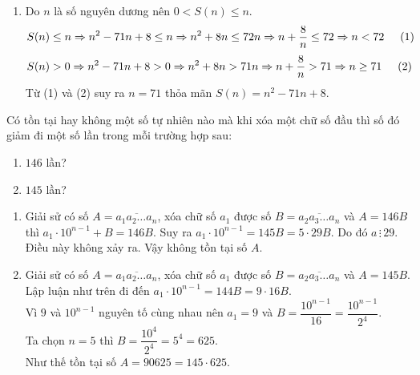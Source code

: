 \begin{bt}
{\begin{enumerate}
   Vậy các số phải tìm là $40$; $41$; $42$; $43$; $44$; $45$; $46$; $47$; $48$; $49$.
   \item Do $n$ là số nguyên dương nên $0 < S(n) \leq n$.\\
   $$S(n) \leq n \Rightarrow n^2 - 71n + 8 \leq n \Rightarrow n^2 + 8n \leq 72n \Rightarrow n + \dfrac{8}{n} \leq 72 \Rightarrow n < 72 \hspace*{0.5cm} (1)$$
   $$S(n) > 0 \Rightarrow n^2 - 71n + 8 > 0 \Rightarrow n^2 + 8n > 71n \Rightarrow n + \dfrac{8}{n} > 71 \Rightarrow n \geq 71 \hspace*{0.5cm} (2)$$
   Từ (1) và (2) suy ra $n = 71$ thỏa mãn $S(n) = n^2 - 71n + 8$.
  \end{enumerate}      
  }
\end{bt}


\begin{bt}
 Có tồn tại hay không một số tự nhiên nào mà khi xóa một chữ số đầu thì số đó giảm đi một số lần trong mỗi trường hợp sau:
 \begin{multicols}{2}
  \begin{enumerate}
   \item $146$ lần?
   \item $145$ lần?
  \end{enumerate}
 \end{multicols}
 \loigiai
  {
  \begin{enumerate}
   \item Giải sử có số $A = \overline{a_1 a_2 \ldots a_n}$, xóa chữ số $a_1$ được số $B = \overline{a_2 a_3 \ldots a_n}$ và $A = 146B$ thì $a_1 \cdot 10^{n-1} + B = 146B$. Suy ra $a_1 \cdot 10^{n-1} = 145B = 5 \cdot 29B$. Do đó $a \, \vdots \, 29$. Điều này không xảy ra. Vậy không tồn tại số $A$.
   \item Giải sử có số $A = \overline{a_1 a_2 \ldots a_n}$, xóa chữ số $a_1$ được số $B = \overline{a_2 a_3 \ldots a_n}$ và $A = 145B$.\\
   Lập luận như trên đi đến $a_1 \cdot 10^{n-1} = 144B = 9 \cdot 16B$.\\
   Vì $9$ và $10^{n-1}$ nguyên tố cùng nhau nên $a_1 = 9$ và $B = \dfrac{10^{n-1}}{16} = \dfrac{10^{n-1}}{2^4}$.\\
   Ta chọn $n = 5$ thì $B = \dfrac{10^4}{2^4} = 5^4 = 625$.\\
   Như thế tồn tại số $A = 90625 = 145 \cdot 625$.
  \end{enumerate}      
  }
\end{bt}


